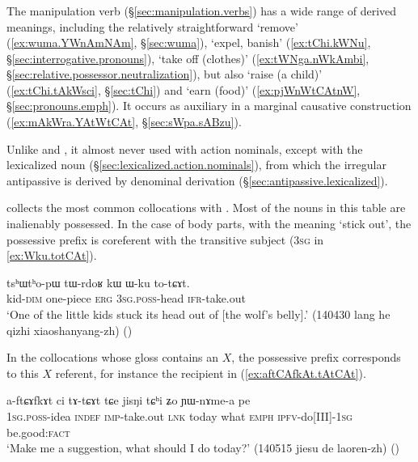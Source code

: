 \subsubsection{ } \label{sec:tCAt.lv}
The manipulation verb  (§\ref{sec:manipulation.verbs}) has a wide range of derived meanings, including the relatively straightforward `remove' (\ref{ex:wuma.YWnAmNAm}, §\ref{sec:wuma}), `expel, banish' (\ref{ex:tChi.kWNu}, §\ref{sec:interrogative.pronouns}), `take off (clothes)' (\ref{ex:tWNga.nWkAmbi}, §\ref{sec:relative.possessor.neutralization}), but also `raise (a child)' (\ref{ex:tChi.tAkWsci}, §\ref{sec:tChi}) and `earn (food)' (\ref{ex:pjWnWtCAtnW}, §\ref{sec:pronouns.emph}). It occurs as auxiliary in a marginal causative construction (\ref{ex:mAkWra.YAtWtCAt}, §\ref{sec:sWpa.sABzu}).

Unlike  and , it almost never used with  action nominals, except with the lexicalized noun  (§\ref{sec:lexicalized.action.nominals}), from which the irregular antipassive  is derived by denominal derivation (§\ref{sec:antipassive.lexicalized}).

 collects the most common collocations with . Most of the nouns in this table are inalienably possessed. In the case of body parts, with the meaning `stick out', the possessive prefix is coreferent with the transitive subject (\textsc{3sg} in \ref{ex:Wku.totCAt}).

\begin{exe}
\ex \label{ex:Wku.totCAt}
\gll tsʰɯtʰo-pɯ tɯ-rdoʁ kɯ ɯ-ku to-tɕɤt. \\
kid-\textsc{dim} one-piece \textsc{erg} \textsc{3sg}.\textsc{poss}-head \textsc{ifr}-take.out \\
\glt `One of the little kids stuck its head out of [the wolf's belly].' (140430 lang he qizhi xiaoshanyang-zh)
()
\end{exe}

In the collocations whose gloss contains an $X$, the possessive prefix corresponds to this $X$ referent, for instance the recipient in  (\ref{ex:aftCAfkAt.tAtCAt}).

\begin{exe}
\ex \label{ex:aftCAfkAt.tAtCAt}
\gll  a-ftɕɤfkɤt ci tɤ-tɕɤt tɕe jisŋi tɕʰi ʑo ɲɯ-nɤme-a pe \\
\textsc{1sg}.\textsc{poss}-idea \textsc{indef} \textsc{imp}-take.out \textsc{lnk} today what \textsc{emph} \textsc{ipfv}-do[III]-\textsc{1sg} be.good:\textsc{fact}  \\
\glt `Make me a suggestion, what should I do today?' (140515 jiesu de laoren-zh)
()
\end{exe}



